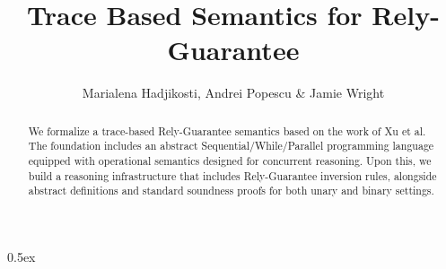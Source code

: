 \documentclass[11pt,a4paper]{article}
\begin{document}
\title{Trace Based Semantics for Rely-Guarantee}
\author{Marialena Hadjikosti, Andrei Popescu \& Jamie Wright}
\maketitle

\begin{abstract}
We formalize a trace-based Rely-Guarantee semantics based on the work of Xu et al. The foundation includes an abstract Sequential/While/Parallel programming language equipped with operational semantics designed for concurrent reasoning. Upon this, we build a reasoning infrastructure that includes Rely-Guarantee inversion rules, alongside abstract definitions and standard soundness proofs for both unary and binary settings. 
\end{abstract} 


\tableofcontents

\parindent 0pt\parskip 0.5ex



%
%




\end{document}
